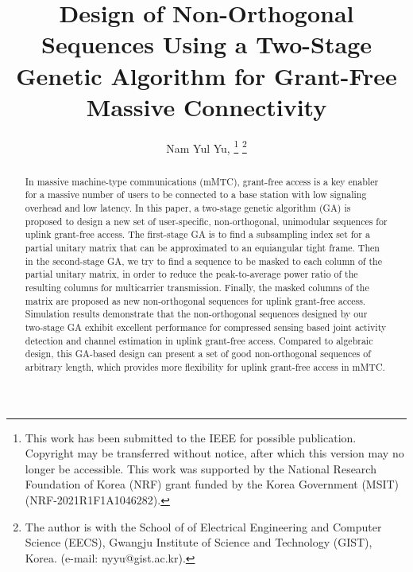 \documentclass[journal]{IEEEtran}
\numberwithin{const2}{const}
\begin{document}
\title{Design of Non-Orthogonal Sequences Using a Two-Stage Genetic Algorithm for Grant-Free Massive Connectivity}

\author{Nam Yul Yu, 
\thanks{This work has been submitted to the IEEE for possible publication. 
	Copyright may be transferred without notice, after which this version may no longer be accessible.
	This work was supported by the National Research Foundation of Korea (NRF) grant funded by the Korea Government (MSIT)
	(NRF-2021R1F1A1046282).}
\thanks{The author is with the School of
of Electrical Engineering and Computer Science (EECS), Gwangju Institute of Science and Technology (GIST), Korea.
(e-mail: nyyu@gist.ac.kr).}
}  %

\maketitle

\begin{abstract}
In massive machine-type communications (mMTC),
grant-free access is a key enabler for a massive number of users
to be connected to a base station with low signaling overhead and low latency.
In this paper, a two-stage genetic algorithm (GA) is proposed 
to design a new set of user-specific, non-orthogonal, unimodular sequences
for uplink grant-free access.
The first-stage GA is
to find a subsampling index set for a partial unitary matrix 
that can be approximated to an equiangular tight frame.
Then in the second-stage GA, we try to find a sequence to be masked to each column
of the partial unitary matrix, 
in order to reduce the peak-to-average power ratio of the resulting columns
for multicarrier transmission.
Finally, the masked columns of the matrix are proposed as new non-orthogonal sequences  
for uplink grant-free access.
Simulation results 
demonstrate that the non-orthogonal sequences designed by our two-stage GA
exhibit excellent performance 
for compressed sensing based joint activity detection and channel estimation
in uplink grant-free access.
Compared to algebraic design,
this GA-based design 
can present a set of good non-orthogonal sequences of arbitrary length, 
which provides more flexibility for uplink grant-free access in mMTC.
\end{abstract}
\end{document}
